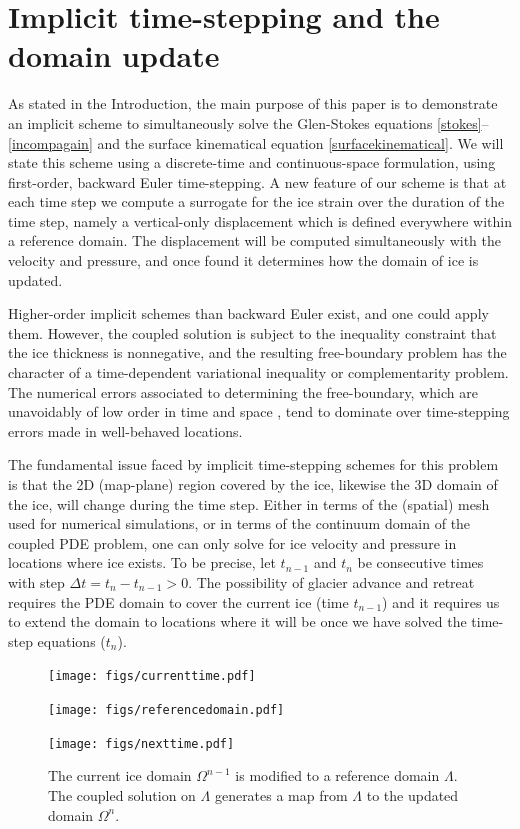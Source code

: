 \documentclass[letterpaper,final,12pt,reqno]{amsart}
\begin{document}
\section{Implicit time-stepping and the domain update} \label{sec:implicitstep}

As stated in the Introduction, the main purpose of this paper is to demonstrate an implicit scheme to simultaneously solve the Glen-Stokes equations \eqref{stokes}--\eqref{incompagain} and the surface kinematical equation \eqref{surfacekinematical}.  We will state this scheme using a discrete-time and continuous-space formulation, using first-order, backward Euler time-stepping.  A new feature of our scheme is that at each time step we compute a surrogate for the ice strain over the duration of the time step, namely a vertical-only displacement which is defined everywhere within a reference domain.  The displacement will be computed simultaneously with the velocity and pressure, and once found it determines how the domain of ice is updated.

Higher-order implicit schemes than backward Euler exist, and one could apply them.  However, the coupled solution is subject to the inequality constraint that the ice thickness is nonnegative, and the resulting free-boundary problem has the character of a time-dependent variational inequality \cite{Calvoetal2002} or complementarity \cite{Bueler2016} problem.  The numerical errors associated to determining the free-boundary, which are unavoidably of low order in time and space \cite{Bueler2020}, tend to dominate over time-stepping errors made in well-behaved locations.

The fundamental issue faced by implicit time-stepping schemes for this problem is that the 2D (map-plane) region covered by the ice, likewise the 3D domain of the ice, will change during the time step.  Either in terms of the (spatial) mesh used for numerical simulations, or in terms of the continuum domain of the coupled PDE problem, one can only solve for ice velocity and pressure in locations where ice exists.  To be precise, let $t_{n-1}$ and $t_n$ be consecutive times with step $\Delta t = t_n - t_{n-1} > 0$.  The possibility of glacier advance and retreat requires the PDE domain to cover the current ice (time $t_{n-1}$) and it requires us to extend the domain to locations where it will be once we have solved the time-step equations ($t_n$).

\begin{figure}[ht]
\begin{center}
\texttt{[image: figs/currenttime.pdf]}
\vspace{-6mm}

\texttt{[image: figs/referencedomain.pdf]}
\vspace{-1mm}

\texttt{[image: figs/nexttime.pdf]}
\end{center}
\caption{The current ice domain $\Omega^{n-1}$ is modified to a reference domain $\Lambda$.  The coupled solution on $\Lambda$ generates a map from $\Lambda$ to the updated domain $\Omega^n$.}
\label{fig:domainupdate}
\end{figure}
\end{document}
